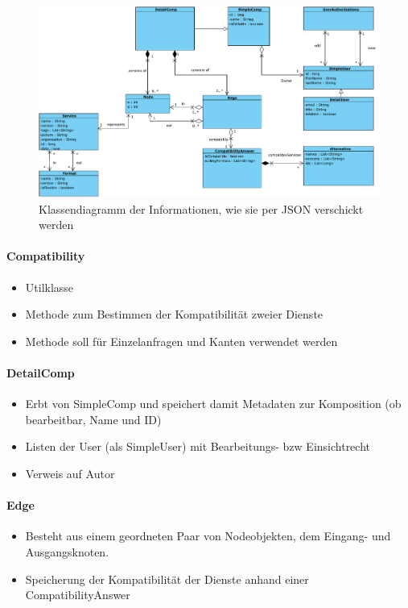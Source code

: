 \begin{figure}[!h]
	\centering
	\includegraphics[width=\textwidth]{img/Diagramme/Klassen/Send}
	\caption{Klassendiagramm der Informationen, wie sie per JSON verschickt werden}
	\label{fig:klassendiagramm-model}
\end{figure}



\paragraph{Compatibility}
\begin{itemize}
	\item Utilklasse
	\item Methode zum Bestimmen der Kompatibilität zweier Dienste
	\item Methode soll für Einzelanfragen und Kanten verwendet werden
\end{itemize} 



\paragraph{DetailComp}
\begin{itemize}
	\item Erbt von SimpleComp und speichert damit Metadaten zur Komposition (ob bearbeitbar, Name und ID)
	\item Listen der User (als SimpleUser) mit Bearbeitungs- bzw Einsichtrecht
	\item Verweis auf Autor
\end{itemize}
\paragraph{Edge}
\begin{itemize}
	\item Besteht aus einem geordneten Paar von Nodeobjekten, dem Eingang- und Ausgangsknoten.
	\item Speicherung der Kompatibilität der Dienste anhand einer CompatibilityAnswer
\end{itemize}
